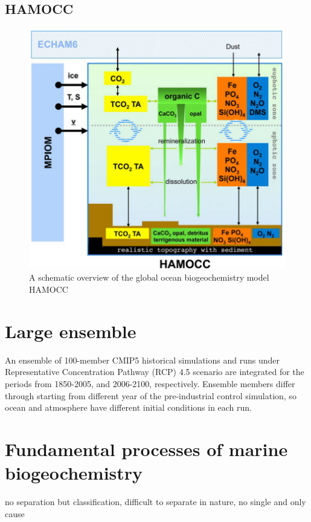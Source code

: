 \subsection{HAMOCC}
\begin{figure}[h]
	\centering
	\includegraphics[scale=.5]{gfx/hamocc.png}
	\caption{A schematic overview of the global ocean biogeochemistry model HAMOCC}
	\label{fig:hamocc}
\end{figure}

\section{Large ensemble}
An ensemble of 100-member CMIP5 historical simulations and runs under  Representative Concentration Pathway (RCP) 4.5 scenario are integrated for the periods from 1850-2005, and 2006-2100, respectively. Ensemble members differ through starting from different year of the pre-industrial control simulation, so ocean and atmosphere have different initial conditions in each run.  

\section{Fundamental processes of marine biogeochemistry}
no separation but classification, difficult to separate in nature, no single and only cause
